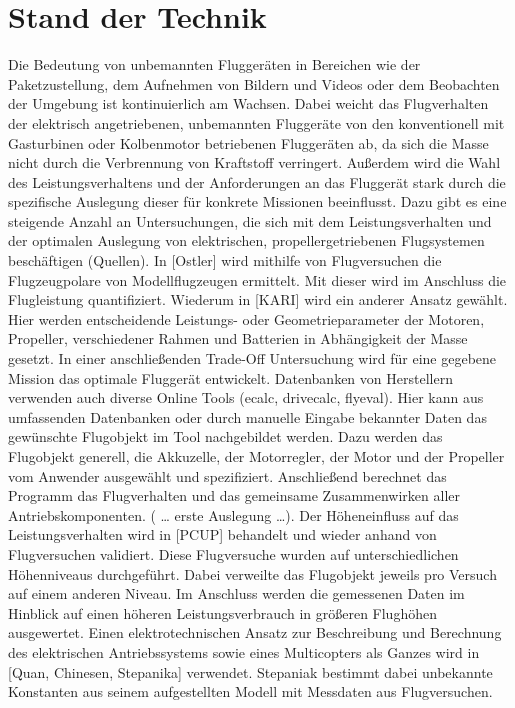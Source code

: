 \section{Stand der Technik}
\label{sec:stand_der_technik}
Die Bedeutung von unbemannten Fluggeräten in Bereichen wie der Paketzustellung, dem Aufnehmen von Bildern und Videos oder dem Beobachten der Umgebung ist kontinuierlich am Wachsen. Dabei weicht das Flugverhalten der elektrisch angetriebenen, unbemannten Fluggeräte von den konventionell mit Gasturbinen oder Kolbenmotor betriebenen Fluggeräten ab, da sich die Masse nicht durch die Verbrennung von Kraftstoff verringert. Außerdem wird die Wahl des Leistungsverhaltens und der Anforderungen an das Fluggerät stark durch die spezifische Auslegung dieser für konkrete Missionen beeinflusst. 
Dazu gibt es eine steigende Anzahl an Untersuchungen, die sich mit dem Leistungsverhalten und der optimalen Auslegung von elektrischen, propellergetriebenen Flugsystemen beschäftigen (Quellen). In [Ostler] wird mithilfe von Flugversuchen die Flugzeugpolare von Modellflugzeugen ermittelt. Mit dieser wird im Anschluss die Flugleistung quantifiziert. Wiederum in [KARI] wird ein anderer Ansatz gewählt. Hier werden entscheidende Leistungs- oder Geometrieparameter der Motoren, Propeller, verschiedener Rahmen und Batterien in Abhängigkeit der Masse gesetzt. In einer anschließenden Trade-Off Untersuchung wird für eine gegebene Mission das optimale Fluggerät entwickelt. Datenbanken von Herstellern verwenden auch diverse Online Tools (ecalc, drivecalc, flyeval). Hier kann aus umfassenden Datenbanken oder durch manuelle Eingabe bekannter Daten das gewünschte Flugobjekt im Tool nachgebildet werden. Dazu werden das Flugobjekt generell, die Akkuzelle, der Motorregler, der Motor und der Propeller vom Anwender ausgewählt und spezifiziert. Anschließend berechnet das Programm das Flugverhalten und das gemeinsame Zusammenwirken aller Antriebskomponenten. ( … erste Auslegung …). Der Höheneinfluss auf das Leistungsverhalten wird in [PCUP] behandelt und wieder anhand von Flugversuchen validiert. Diese Flugversuche wurden auf unterschiedlichen Höhenniveaus durchgeführt. Dabei verweilte das Flugobjekt jeweils pro Versuch auf einem anderen Niveau. Im Anschluss werden die gemessenen Daten im Hinblick auf einen höheren Leistungsverbrauch in größeren Flughöhen ausgewertet. Einen elektrotechnischen Ansatz zur Beschreibung und Berechnung des elektrischen Antriebssystems sowie eines Multicopters als Ganzes wird in [Quan, Chinesen, Stepanika] verwendet. Stepaniak bestimmt dabei unbekannte Konstanten aus seinem aufgestellten Modell mit Messdaten aus Flugversuchen. 
